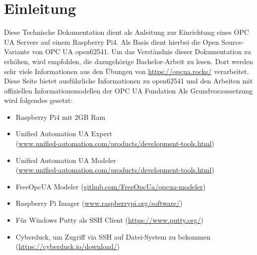 \section{Einleitung} \label{sec:einleitung}
Diese Technische Dokumentation dient als Anleitung zur Einrichtung eines OPC UA Servers auf einem Raspberry Pi4. Als Basis dient hierbei die Open Source-Variante von OPC UA open62541. Um das Verständnis dieser Dokumentation zu erhöhen, wird empfohlen, die dazugehörige Bachelor-Arbeit zu lesen. Dort werden sehr viele Informationen aus den Übungen von \url{https://opcua.rocks/} verarbeitet. Diese Seite bietet ausführliche Informationen zu open62541 und den Arbeiten mit offiziellen Informationsmodellen der OPC UA Fundation
Als Grundvoraussetzung wird folgendes gesetzt:
\begin{itemize}
	\item Raspberry Pi4 mit 2GB Ram
	\item Unified Automation UA Expert \\
	(\url{www.unified-automation.com/products/development-tools.html})
	\item Unified Automation UA Modeler \\
	(\url{www.unified-automation.com/products/development-tools.html})
	\item FreeOpcUA Modeler (\url{github.com/FreeOpcUa/opcua-modeler})
	\item Raspberry Pi Imager (\url{www.raspberrypi.org/software/})
	\item Für Windows Putty als SSH Client
	(\url{https://www.putty.org/})
	\item Cyberduck, um Zugriff via SSH auf Datei-System zu bekommen\\
	(\url{https://cyberduck.io/download/}) 
\end{itemize}

